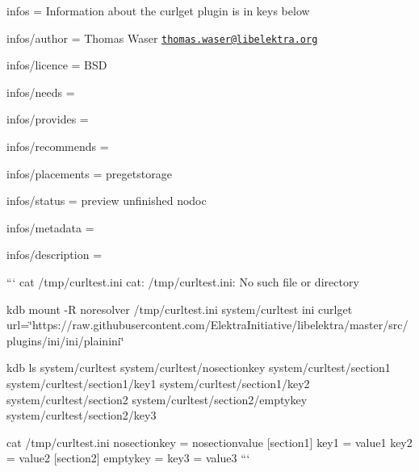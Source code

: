 
\begin{DoxyItemize}
\item infos = Information about the curlget plugin is in keys below
\item infos/author = Thomas Waser \href{mailto:thomas.waser@libelektra.org}{\tt thomas.\+waser@libelektra.\+org}
\item infos/licence = B\+S\+D
\item infos/needs =
\item infos/provides =
\item infos/recommends =
\item infos/placements = pregetstorage
\item infos/status = preview unfinished nodoc
\item infos/metadata =
\item infos/description =
\end{DoxyItemize}

``` cat /tmp/curltest.ini cat\+: /tmp/curltest.ini\+: No such file or directory

kdb mount -\/\+R noresolver /tmp/curltest.ini system/curltest ini curlget url=\char`\"{}https\+://raw.\+githubusercontent.\+com/\+Elektra\+Initiative/libelektra/master/src/plugins/ini/ini/plainini\char`\"{}

kdb ls system/curltest system/curltest/nosectionkey system/curltest/section1 system/curltest/section1/key1 system/curltest/section1/key2 system/curltest/section2 system/curltest/section2/emptykey system/curltest/section2/key3

cat /tmp/curltest.ini nosectionkey = nosectionvalue \mbox{[}section1\mbox{]} key1 = value1 key2 = value2 \mbox{[}section2\mbox{]} emptykey = key3 = value3 ``` 